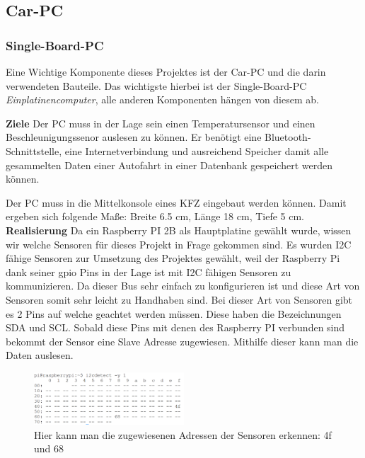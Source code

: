 \subsection{Car-PC}

\subsubsection{Single-Board-PC}
Eine Wichtige Komponente dieses Projektes ist der Car-PC und die darin verwendeten Bauteile. Das wichtigste hierbei ist der Single-Board-PC \textit{Einplatinencomputer}, alle anderen Komponenten hängen von diesem ab.

\textbf{Ziele\newline}
Der PC muss in der Lage sein einen Temperatursensor und einen Beschleunigungssenor auslesen zu können. Er benötigt eine Bluetooth-Schnittstelle, eine Internetverbindung und ausreichend Speicher damit alle gesammelten Daten einer Autofahrt in einer Datenbank gespeichert werden können.

Der PC muss in die Mittelkonsole eines KFZ eingebaut werden können. Damit ergeben sich folgende Maße: Breite 6.5 cm, Länge 18 cm, Tiefe 5 cm.
\textbf{Realisierung\newline}
Da ein Raspberry PI 2B als Hauptplatine gewählt wurde, wissen wir welche Sensoren für dieses Projekt in Frage gekommen sind.
Es wurden I2C fähige Sensoren zur Umsetzung des Projektes gewählt, weil der Raspberry Pi dank seiner gpio Pins in der Lage ist mit I2C fähigen Sensoren zu kommunizieren. Da dieser Bus sehr einfach zu konfigurieren ist und diese Art von Sensoren somit sehr leicht zu Handhaben sind.
Bei dieser Art von Sensoren gibt es 2 Pins auf welche geachtet werden müssen. Diese haben die Bezeichnungen SDA und SCL. Sobald diese Pins mit denen des Raspberry PI verbunden sind bekommt der Sensor eine Slave Adresse zugewiesen. Mithilfe dieser kann man die Daten auslesen.
\begin{figure}[!htb]\centering
	\includegraphics[width=0.5\textwidth]{images/sensorendetect}
	\caption{Hier kann man die zugewiesenen Adressen der Sensoren erkennen: 4f und 68}\label{Fig:imgSensorDetect}
\end{figure}

